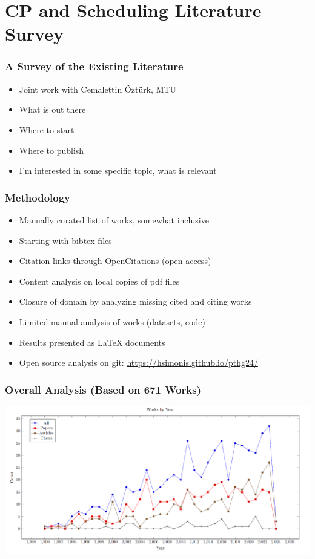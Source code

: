 \section{CP and Scheduling Literature Survey}

\begin{frame}
\frametitle{A Survey of the Existing Literature}
\begin{itemize}
\item Joint work with Cemalettin Öztürk, MTU
\item What is out there
\item Where to start
\item Where to publish
\item I'm interested in some specific topic, what is relevant
\end{itemize}
\end{frame}

\begin{frame}
\frametitle{Methodology}
\begin{itemize}
\item Manually curated list of works, somewhat inclusive
\item Starting with bibtex files
\item Citation links through \href{https://opencitations.net/}{OpenCitations} (open access)
\item Content analysis on local copies of pdf files
\item Closure of domain by analyzing missing cited and citing works 
\item Limited manual analysis of works (datasets, code)
\item Results presented as LaTeX documents
\item Open source analysis on git: \url{https://hsimonis.github.io/pthg24/}
\end{itemize}
\end{frame}

\begin{frame}
\frametitle{Overall Analysis (Based on 671 Works)}
\includegraphics[width=\textwidth]{survey/worksbyyear}
\end{frame}

